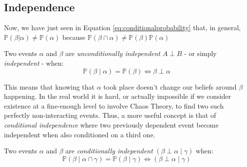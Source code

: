 \subsection{Independence} \label{subsec:independence}
Now, we have just seen in Equation \ref{eq:conditionalprobability} that, in general, $\mathbb{P}(\beta | \alpha) \neq \mathbb{P}(\alpha)$ because $\mathbb{P}(\beta \cap \alpha) \neq \mathbb{P}(\beta) \mathbb{P}(\alpha)$
\begin{definition}
Two events $\alpha$ and $\beta$ are \textit{unconditionally independent} $A \perp B$ - or simply \textit{independent} - when:
\begin{equation}
	\mathbb{P}(\beta \mid \alpha) = \mathbb{P}(\beta) \Leftrightarrow \beta \perp \alpha
\end{equation}
\end{definition}
This means that knowing that $\alpha$ took place doesn't change our beliefs around $\beta$ happening. 
In the real world it is hard, or actually impossible if we consider existence at a fine-enough level to involve Chaos Theory, to find two such perfectly non-interacting events.
Thus, a more useful concept is that of \textit{conditional independence} where two previously dependent event become independent when also conditioned on a third one.
\begin{definition}
Two events $\alpha$ and $\beta$ are \textit{conditionally independent} $(\beta \perp \alpha \mid \gamma)$ when:
	\begin{equation}
	\mathbb{P}(\beta \mid \alpha \cap \gamma ) = \mathbb{P}(\beta \mid \gamma) \Leftrightarrow (\beta \perp \alpha \mid \gamma)
\end{equation}
\end{definition}

